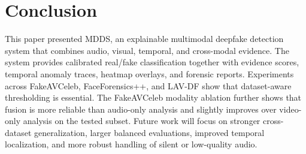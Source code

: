 \documentclass[conference]{IEEEtran}
\begin{document}
\section{Conclusion}
This paper presented MDDS, an explainable multimodal deepfake detection system that combines audio, visual, temporal, and cross-modal evidence. The system provides calibrated real/fake classification together with evidence scores, temporal anomaly traces, heatmap overlays, and forensic reports. Experiments across FakeAVCeleb, FaceForensics++, and LAV-DF show that dataset-aware thresholding is essential. The FakeAVCeleb modality ablation further shows that fusion is more reliable than audio-only analysis and slightly improves over video-only analysis on the tested subset. Future work will focus on stronger cross-dataset generalization, larger balanced evaluations, improved temporal localization, and more robust handling of silent or low-quality audio.



\end{document}
